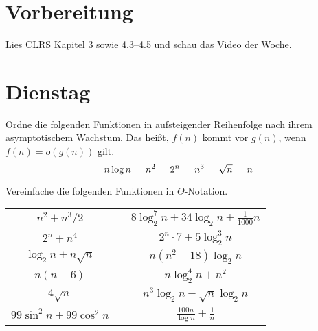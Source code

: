 \documentclass{uebung_cs}
\begin{document}
\section*{Vorbereitung}
Lies CLRS Kapitel 3 sowie 4.3--4.5 und schau das Video der Woche.

\section*{Dienstag}
\begin{aufgabe}\label{tue-first}\mbox{}
	Ordne die folgenden Funktionen in aufsteigender Reihenfolge nach ihrem asymptotischem Wachstum.
	Das heißt, $f(n)$ kommt vor $g(n)$, wenn $f(n) = o(g(n))$ gilt.
	\[n \log n\hspace*{15pt} n^2\hspace*{15pt} 2^n\hspace*{15pt} n^3\hspace*{15pt} \sqrt{n}\hspace*{15pt} n\]
\end{aufgabe}

\begin{aufgabe}
	Vereinfache die folgenden Funktionen in $\Theta$-Notation.
	\begin{center}
		\begin{tabular}{ccc}
			$n^2 + n^3/2$
			&&
			$8\log_2^7 n + 34\log_2 n + \frac{1}{1000}n$\\
			$2^n + n^4$&&
			$2^n\cdot 7 + 5\log_2^3 n$\\
			$\log_2n + n\sqrt{n}$&&
			$n(n^2 - 18)\log_2 n$\\
			$n(n-6)$&&
			$n\log_2^4 n + n^2$\\
			$4\sqrt{n}$&&
			$n^3 \log_2 n + \sqrt{n}\log_2 n$\\
			$99\sin^2 n + 99\cos^2 n$&& $\frac{100n}{\log n}+\frac{1}{n}$
		\end{tabular}
	\end{center}
\end{aufgabe}
\end{document}
